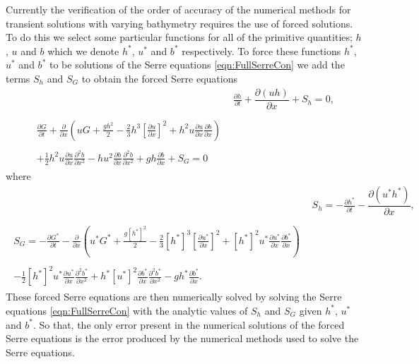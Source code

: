 \documentclass[times]{elsarticle}
\begin{document}
Currently the verification of the order of accuracy of the numerical methods for transient solutions with varying bathymetry requires the use of forced solutions. To do this we select some particular functions for all of the primitive quantities; $h$, $u$ and $b$ which we denote $h^*$, $u^*$ and $b^*$ respectively. To force these functions $h^*$, $u^*$ and $b^*$ to be solutions of the Serre equations \eqref{eqn:FullSerreCon} we add the terms $S_h$ and $S_G$ to obtain the forced Serre equations
\begin{subequations}
	\label{eqn:FullSerreConForced}
	\begin{align}
	& \frac{\partial h}{\partial t} + \dfrac{\partial (uh)}{\partial x} + S_{h}  = 0 ,\label{eqn:FullSerreConMassForced}  \\ \nonumber \\
	\begin{split}
	\label{eqn:SerreconsconmomForced}
	\frac{\partial G}{\partial t}  + \frac{\partial}{\partial x} \left( {u} G + \frac{gh^2}{2} - \frac{2}{3}h^3 \left[ \frac{\partial {u}}{\partial x} \right]^2 + h^2 {u}\frac{\partial {u}}{\partial x}\frac{\partial b}{\partial x} \right) \\ \\ + \frac{1}{2}h^2 {u} \frac{\partial {u}}{\partial x} \frac{\partial^2 b}{\partial x^2}  - h {u}^2\frac{\partial b}{\partial x}\frac{\partial^2 b}{\partial x^2} + gh\frac{\partial b}{\partial x} + S_{G} = 0
	\end{split}
	\end{align}
\end{subequations}
where
\begin{align*}
&  S_{h} = -\frac{\partial h^*}{\partial t} - \dfrac{\partial (u^*h^*)}{\partial x} ,  \\ \nonumber \\
\begin{split}
S_{G} = -\frac{\partial G^*}{\partial t}  - \frac{\partial}{\partial x} \left( {u}^* G^* + \frac{g\left[h^*\right]^2}{2} - \frac{2}{3}\left[h^*\right]^3 \left[\frac{\partial {u}^*}{\partial x}\right]^2 + \left[h^*\right]^2 {u^*}\frac{\partial {u}^*}{\partial x}\frac{\partial b^*}{\partial x} \right) \\ \\ - \frac{1}{2}\left[h^*\right]^2 {u}^* \frac{\partial {u}^*}{\partial x} \frac{\partial^2 b^*}{\partial x^2}  + h^* {\left[u^*\right]}^2\frac{\partial b^*}{\partial x}\frac{\partial^2 b^*}{\partial x^2} - gh^*\frac{\partial b^*}{\partial x}.
\end{split}
\end{align*} 
These forced Serre equations are then numerically solved by solving the Serre equations \eqref{eqn:FullSerreCon} with the analytic values of $S_{h}$ and $S_{G}$ given $h^*$, $u^*$ and $b^*$. So that, the only error present in the numerical solutions of the forced Serre equations is the error produced by the numerical methods used to solve the Serre equations.
\end{document}
